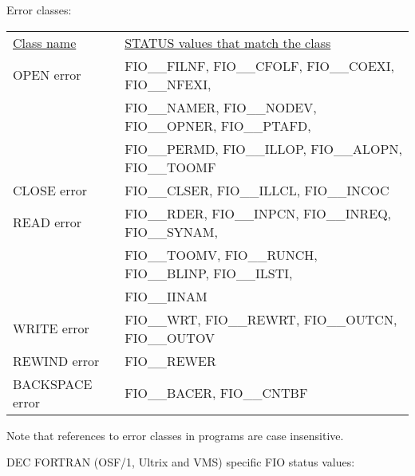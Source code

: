 \documentclass[twoside,11pt,nolof]{starlink}
\begin{document}

Error classes:

\begin{tabular}{ll}
\underline{Class name} & \underline{STATUS values that match the class} \\
OPEN error & FIO\_\_FILNF, FIO\_\_CFOLF, FIO\_\_COEXI, FIO\_\_NFEXI, \\
           & FIO\_\_NAMER, FIO\_\_NODEV, FIO\_\_OPNER, FIO\_\_PTAFD, \\
           & FIO\_\_PERMD, FIO\_\_ILLOP, FIO\_\_ALOPN, FIO\_\_TOOMF \\
CLOSE error & FIO\_\_CLSER, FIO\_\_ILLCL, FIO\_\_INCOC \\
READ error  & FIO\_\_RDER, FIO\_\_INPCN, FIO\_\_INREQ, FIO\_\_SYNAM, \\
            & FIO\_\_TOOMV, FIO\_\_RUNCH, FIO\_\_BLINP, FIO\_\_ILSTI, \\
            & FIO\_\_IINAM \\
WRITE error & FIO\_\_WRT, FIO\_\_REWRT, FIO\_\_OUTCN, FIO\_\_OUTOV \\
REWIND error & FIO\_\_REWER \\
BACKSPACE error & FIO\_\_BACER, FIO\_\_CNTBF \\
\end{tabular}

Note that references to error classes in programs are case insensitive.

\newpage
DEC FORTRAN (OSF/1, Ultrix and VMS) specific FIO status values:
\end{document}
